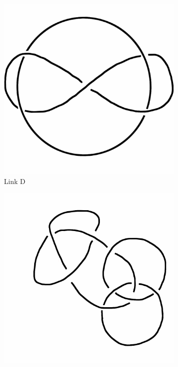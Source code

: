 \documentclass[12pt,letterpaper]{article}
\theoremstyle{definition}
\begin{document}
\begin{figure}[h]
    \begin{subfigure}{.3\textwidth}
        \centering
        \includegraphics[width=\textwidth]{knotpics/whitehead.png}
        \caption{Link D}
    \end{subfigure}
    \quad
    \begin{subfigure}{.3\textwidth}
        \centering
        \includegraphics[width=\textwidth]{knotpics/borromean-trefoil.png}

\end{subfigure}
\end{figure}
\end{document}
